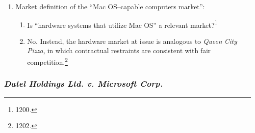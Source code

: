 \begin{enumerate}
\begin{enumerate}
        competition.\footnote{1198--1200.}
        \item \textbf{``~.~.~.~the counterclaim does not plausible allege that 
        Mac OS is an independent market.''}\footnote{1200.}
    \end{enumerate}
    \item Market definition of the ``Mac OS--capable computers market'':
    \begin{enumerate}
        \item Is ``hardware systems that utilize Mac OS'' a relevant 
        market?\footnote{1200.}
        \item No. Instead, the hardware market at issue is analogous to 
        \emph{Queen City Pizza}, in which contractual restraints are 
        consistent with fair competition.\footnote{1202.}
    \end{enumerate}
\end{enumerate}

\subsubsection{\emph{Datel Holdings Ltd. v. Microsoft Corp.}}

